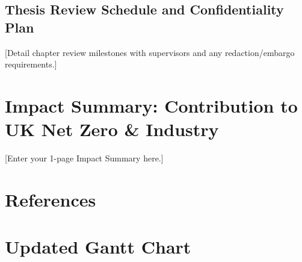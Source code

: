 \documentclass[year3]{../idcore-ar}
\begin{document}
\subsection{Thesis Review Schedule and Confidentiality Plan}
[Detail chapter review milestones with supervisors and any redaction/embargo requirements.]


\section{Impact Summary: Contribution to UK Net Zero \& Industry}

[Enter your 1-page Impact Summary here.]


\newpage
\section{References}





\newpage
\section{Updated Gantt Chart}

\begin{center}
  \vspace{1cm}
\end{center}


\newpage
\end{document}
